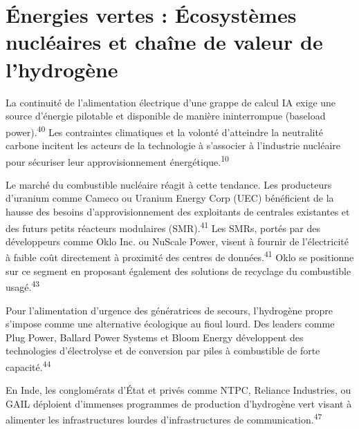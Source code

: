 \documentclass[11pt,a4paper]{article}
\begin{document}
\section*{Énergies vertes : Écosystèmes nucléaires et chaîne de valeur de l'hydrogène}

La continuité de l'alimentation électrique d'une grappe de calcul IA exige une source d'énergie pilotable et disponible de manière ininterrompue (baseload power).\textsuperscript{40} Les contraintes climatiques et la volonté d'atteindre la neutralité carbone incitent les acteurs de la technologie à s'associer à l'industrie nucléaire pour sécuriser leur approvisionnement énergétique.\textsuperscript{10}

Le marché du combustible nucléaire réagit à cette tendance. Les producteurs d'uranium comme Cameco ou Uranium Energy Corp (UEC) bénéficient de la hausse des besoins d'approvisionnement des exploitants de centrales existantes et des futurs petits réacteurs modulaires (SMR).\textsuperscript{41} Les SMRs, portés par des développeurs comme Oklo Inc. ou NuScale Power, visent à fournir de l'électricité à faible coût directement à proximité des centres de données.\textsuperscript{41} Oklo se positionne sur ce segment en proposant également des solutions de recyclage du combustible usagé.\textsuperscript{43}

Pour l'alimentation d'urgence des génératrices de secours, l'hydrogène propre s'impose comme une alternative écologique au fioul lourd. Des leaders comme Plug Power, Ballard Power Systems et Bloom Energy développent des technologies d'électrolyse et de conversion par piles à combustible de forte capacité.\textsuperscript{44}

En Inde, les conglomérats d'État et privés comme NTPC, Reliance Industries, ou GAIL déploient d'immenses programmes de production d'hydrogène vert visant à alimenter les infrastructures lourdes d'infrastructures de communication.\textsuperscript{47}
\end{document}
